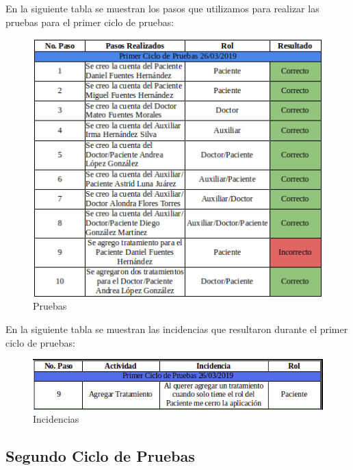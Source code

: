 En la siguiente tabla se muestran los pasos que utilizamos para realizar las pruebas para el primer ciclo de pruebas:
\newpage
\begin{figure}[!htbp]			
	\hypertarget{fig:Pruebas}{\hspace{1pt}}
	\begin{center}
		\includegraphics[height=0.5\textheight]{Pruebas/images/ppc1}
		\caption{Pruebas}
		\label{fig:Pruebas}
	\end{center}
\end{figure}

En la siguiente tabla se muestran las incidencias que resultaron durante el primer ciclo de pruebas:

\begin{figure}[!htbp]			
	\hypertarget{fig:Incidencias}{\hspace{1pt}}
	\begin{center}
		\includegraphics[height=0.1\textheight]{Pruebas/images/Inc1}
		\caption{Incidencias}
		\label{fig:Incidencias}
	\end{center}
\end{figure}


\subsection{Segundo Ciclo de Pruebas}

